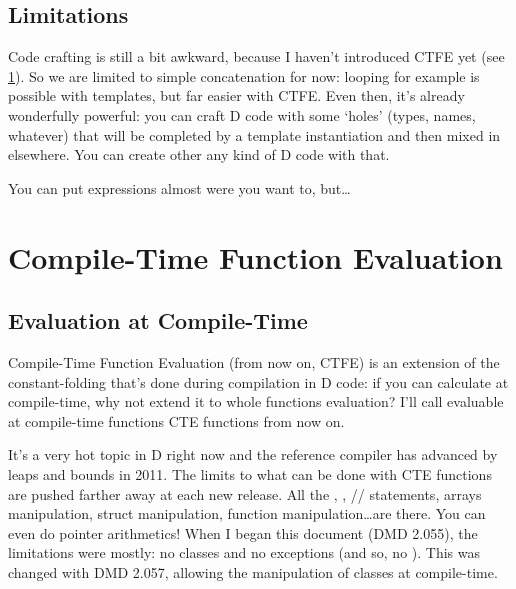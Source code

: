 \subsection{Limitations}\label{stringmixinslimitations}

Code crafting is still a bit awkward, because I haven't introduced CTFE yet (see \ref{ctfe}). So we are limited to simple concatenation for now: looping for example is possible with templates, but far easier with CTFE. Even then, it's already wonderfully powerful: you can craft D code with some `holes' (types, names, whatever) that will be completed by a template instantiation and then mixed in elsewhere. You can create other any kind of D code with that.

You can put \DD{()} expressions almost were you want to, but\ldots




\section{Compile-Time Function Evaluation} \label{ctfe}

\subsection{Evaluation at Compile-Time} \label{compiletimeevaluation}

Compile-Time Function Evaluation
(from now on, CTFE) is an extension of the constant-folding that's done during compilation in D code: if you can calculate  at compile-time, why not extend it to whole functions evaluation? I'll call evaluable at compile-time functions CTE functions from now on.

It's a very hot topic in D right now and the reference compiler has advanced by leaps and bounds in 2011. The limits to what can be done with CTE functions are pushed farther away at each new release.  All the , , // statements, arrays manipulation, struct manipulation, function manipulation\ldots are there. You can even do pointer arithmetics! When I began this document (DMD 2.055), the limitations were mostly: no classes and no exceptions (and so, no ). This was changed with DMD 2.057, allowing the manipulation of classes at compile-time.

